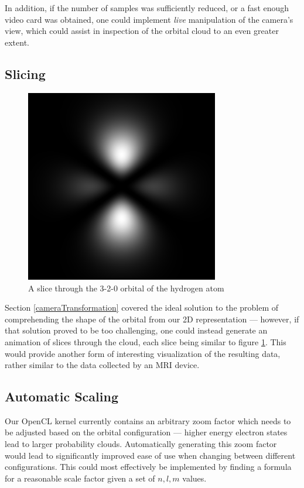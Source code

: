 \documentclass{acmsiggraph}
\begin{document}
In addition, if the number of samples was sufficiently reduced, or a fast enough video card was obtained, one could implement {\it live} manipulation of the camera's view, which could assist in inspection of the orbital cloud to an even greater extent.

\subsection{Slicing}

\begin{figure}
    \includegraphics[width=84.5mm]{320-slice.png}
    \caption{A slice through the 3-2-0 orbital of the hydrogen atom}
    \label{fig:slice}
\end{figure}

Section \ref{cameraTransformation} covered the ideal solution to the problem of comprehending the shape of the orbital from our 2D representation --- however, if that solution proved to be too challenging, one could instead generate an animation of slices through the cloud, each slice being similar to figure \ref{fig:slice}. This would provide another form of interesting visualization of the resulting data, rather similar to the data collected by an MRI device.

\subsection{Automatic Scaling}

Our OpenCL kernel currently contains an arbitrary zoom factor which needs to be adjusted based on the orbital configuration --- higher energy electron states lead to larger probability clouds. Automatically generating this zoom factor would lead to significantly improved ease of use when changing between different configurations. This could most effectively be implemented by finding a formula for a reasonable scale factor given a set of $n, l, m$ values.
\end{document}
